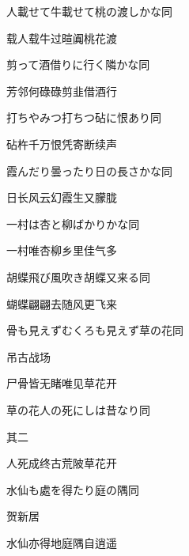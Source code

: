 \begin{haiku}
    {\FH 人載せて牛載せて桃の渡しかな}\hfill{\FH 同}

    {\FK 载人载牛过暄阗桃花渡}
\end{haiku}

\begin{haiku}
    {\FH {}剪って酒借りに行く隣かな}\hfill{\FH 同}

    {\FK 芳邻何碌碌剪韭借酒行}
\end{haiku}

\begin{haiku}
    {\FH 打ちやみつ打ちつ砧に恨あり}\hfill{\FH 同}

    {\FK 砧杵千万恨凭寄断续声}
\end{haiku}

\begin{haiku}
    {\FH 霞んだり曇ったり日の長さかな}\hfill{\FH 同}

    {\FK 日长风云幻霞生又朦胧}
\end{haiku}

\begin{haiku}
    {\FH 一村は杏と柳ばかりかな}\hfill{\FH 同}

    {\FK 一村唯杏柳乡里佳气多}
\end{haiku}

\begin{haiku}
    {\FH 胡蝶飛び風吹き胡蝶又来る}\hfill{\FH 同}

    {\FK 蝴蝶翩翩去随风更飞来}
\end{haiku}

\begin{haiku}
    {\FH 骨も見えずむくろも見えず草の花}\hfill{\FH 同}

    {\FK 吊古战场}

    {\FK 尸骨皆无睹唯见草花开}
\end{haiku}

\begin{haiku}
    {\FH 草の花人の死にしは昔なり}\hfill{\FH 同}

    {\FK 其二}

    {\FK 人死成终古荒陂草花开}
\end{haiku}

\begin{haiku}
    {\FH 水仙も處を得たり庭の隅}\hfill{\FH 同}

    {\FK 贺新居}

    {\FK 水仙亦得地庭隅自逍遥}
\end{haiku}

